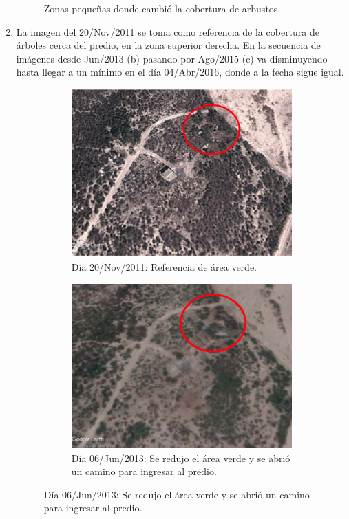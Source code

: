 \documentclass[12pt,letterpaper]{article}
\begin{document}
\begin{enumerate}
\begin{figure}[H]
\begin{subfigure}{5\textwidth}
            \label{fig:caminos2}
        \end{subfigure}
        \caption{Zonas pequeñas donde cambió la cobertura de arbustos.}
        \label{fig:caminos_2007}
    \end{figure}
    \pagebreak
    \item La imagen del 20/Nov/2011 se toma como referencia de la cobertura de árboles cerca del predio, en la zona superior derecha. En la secuencia de imágenes desde Jun/2013 (b) pasando por Ago/2015 (c) va disminuyendo hasta llegar a un mínimo en el día 04/Abr/2016, donde a la fecha sigue igual.
    \begin{figure}[H]
        \begin{subfigure}{3.5\textwidth}
            \includegraphics[scale=0.42]{20111120.png}
            \caption{Día 20/Nov/2011: Referencia de área verde.}
        \end{subfigure}
        \begin{subfigure}{3.5\textwidth}
            \includegraphics[scale=0.48]{20130606.png}
            \caption{Día 06/Jun/2013: Se redujo el área verde y se abrió un camino para ingresar al predio.}

\end{subfigure}
\end{figure}
\end{enumerate}
\end{document}
